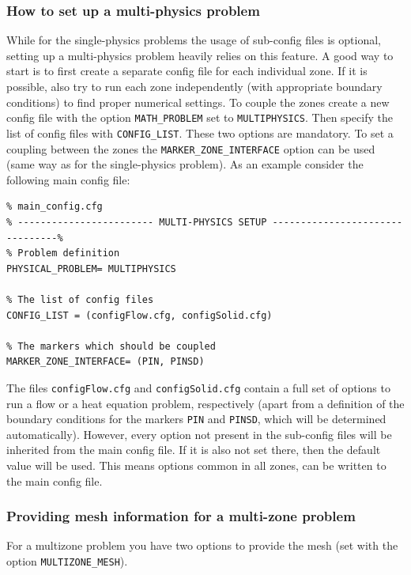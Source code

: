 \documentclass{article}
\begin{document}
\subsubsection{How to set up a multi-physics problem}

While for the single-physics problems the usage of sub-config files is optional, setting up a multi-physics problem heavily relies on this feature. A good way to start is to first create a separate config file for each individual zone. If it is possible, also try to run each zone independently (with appropriate boundary conditions) to find proper numerical settings. To couple the zones create a new config file with the option \verb|MATH_PROBLEM| set to \verb|MULTIPHYSICS|. Then specify the list of config files with \verb|CONFIG_LIST|. These two options are mandatory. To set a coupling between the zones the \verb|MARKER_ZONE_INTERFACE| option can be used (same way as for the single-physics problem). As an example consider the following main config file:

\begin{lstlisting}
% main_config.cfg
% ------------------------ MULTI-PHYSICS SETUP --------------------------------%
% Problem definition
PHYSICAL_PROBLEM= MULTIPHYSICS

% The list of config files
CONFIG_LIST = (configFlow.cfg, configSolid.cfg)

% The markers which should be coupled
MARKER_ZONE_INTERFACE= (PIN, PINSD)

\end{lstlisting}


The files \verb|configFlow.cfg| and \verb|configSolid.cfg| contain a full set of options to run a flow or a heat equation problem, respectively (apart from a definition of the boundary conditions for the markers \verb|PIN| and \verb|PINSD|, which will be determined automatically). However, every option not present in the sub-config files will be inherited from the main config file. If it is also not set there, then the default value will be used. This means options common in all zones, can be written to the main config file.

\subsubsection{Providing mesh information for a multi-zone problem}

For a multizone problem you have two options to provide the mesh (set with the option \verb|MULTIZONE_MESH|).
\end{document}
